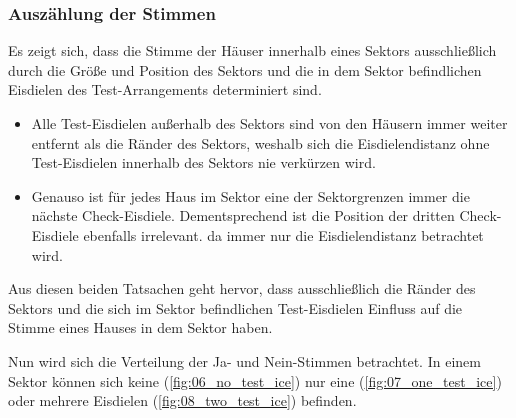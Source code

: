 \documentclass[a4paper,10pt,ngerman,captions=figureheading]{scrartcl}
\begin{document}
\subsubsection{Auszählung der Stimmen}
\label{sec:Auszählung_der_Stimmen}
Es zeigt sich, dass die Stimme der Häuser innerhalb eines Sektors ausschließlich durch die Größe und Position des Sektors und die in dem Sektor befindlichen Eisdielen des Test-Arrangements determiniert sind.
\begin{itemize}
    \item Alle Test-Eisdielen außerhalb des Sektors sind von den Häusern immer weiter entfernt als die Ränder des Sektors, weshalb sich die Eisdielendistanz ohne Test-Eisdielen innerhalb des Sektors nie verkürzen wird.
    \item Genauso ist für jedes Haus im Sektor eine der Sektorgrenzen immer die nächste Check-Eisdiele.
          Dementsprechend ist die Position der dritten Check-Eisdiele ebenfalls irrelevant. da immer nur die Eisdielendistanz betrachtet wird.
\end{itemize}
Aus diesen beiden Tatsachen geht hervor, dass ausschließlich die Ränder des Sektors und die sich im Sektor befindlichen Test-Eisdielen Einfluss auf die Stimme eines Hauses in dem Sektor haben.

\medskip
Nun wird sich die Verteilung der Ja- und Nein-Stimmen betrachtet.
In einem Sektor können sich keine (\autoref{fig:06_no_test_ice}) nur eine (\autoref{fig:07_one_test_ice}) oder mehrere Eisdielen (\autoref{fig:08_two_test_ice}) befinden.
\end{document}
